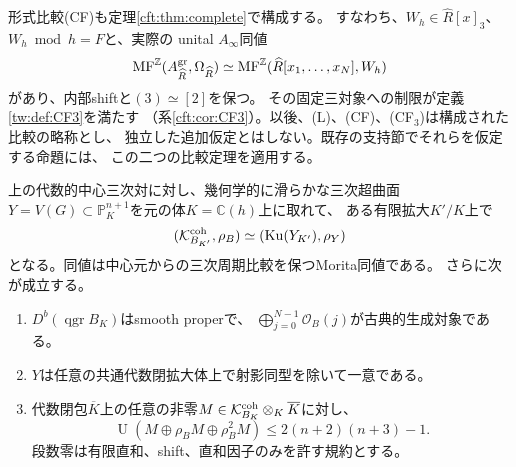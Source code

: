 形式比較(CF)も定理\ref{cft:thm:complete}で構成する。
すなわち、$W_h\in\widehat R[x]_3$、$W_h\bmod h=F$と、実際の
unital $A_\infty$同値
\begin{equation}\label{gdr:eq:cf}
 \operatorname{MF}^{\mathbb Z}(A^{\rm gr}_{\widehat R},\Omega_{\widehat R})
 \simeq\operatorname{MF}^{\mathbb Z}(\widehat R[x_1,\ldots,x_N],W_h)
\end{equation}
があり、内部shiftと$(3)\simeq[2]$を保つ。
その固定三対象への制限が定義\ref{tw:def:CF3}を満たす
（系\ref{cft:cor:CF3}）。以後、(L)、(CF)、(CF$_3$)は構成された比較の略称とし、
独立した追加仮定とはしない。既存の支持節でそれらを仮定する命題には、
この二つの比較定理を適用する。

\begin{theorem}[代数的中心三次変形の一般点可換復元]
\label{gdr:thm:generic}
上の代数的中心三次対に対し、幾何学的に滑らかな三次超曲面
$Y=V(G)\subset\mathbb P^{n+1}_K$を元の体$K=\mathbb C(h)$上に取れて、
ある有限拡大$K'/K$上で
\begin{equation}\label{gdr:eq:main}
 (\mathcal K^{\rm coh}_{B_{K'}},\rho_B)
 \simeq(\operatorname{Ku}(Y_{K'}),\rho_Y)
\end{equation}
となる。同値は中心元からの三次周期比較を保つMorita同値である。
さらに次が成立する。
\begin{enumerate}
\item $D^b(\operatorname{qgr}B_K)$はsmooth properで、
$\bigoplus_{j=0}^{N-1}\mathcal O_B(j)$が古典的生成対象である。
\item $Y$は任意の共通代数閉拡大体上で射影同型を除いて一意である。
\item 代数閉包$\overline K$上の任意の非零$M\in\mathcal K^{\rm coh}_{B_K}\otimes_K\overline K$に対し、
\begin{equation}\label{gdr:eq:uniform-bound}
 \operatorname U(M\oplus\rho_BM\oplus\rho_B^2M)\le2(n+2)(n+3)-1.
\end{equation}
段数零は有限直和、shift、直和因子のみを許す規約とする。
\end{enumerate}
\end{theorem}

